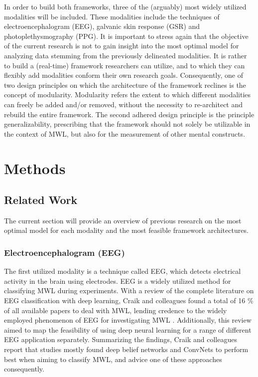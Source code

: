 \documentclass{article}
\begin{document}
In order to build both frameworks, three of the (arguably) most widely utilized modalities will be included. These modalities include the techniques of electroencephalogram (EEG), galvanic skin response (GSR) and photoplethysmography (PPG). It is important to stress again that the objective of the current research is not to gain insight into the most optimal model for analyzing data stemming from the previously delineated modalities. It is rather to build a (real-time) framework researchers can utilize, and to which they can flexibly add modalities conform their own research goals. Consequently, one of two design principles on which the architecture of the framework reclines is the concept of modularity. Modularity refers the extent to which different modalities can freely be added and/or removed, without the necessity to re-architect and rebuild the entire framework. The second adhered design principle is the principle generalizability, prescribing that the framework should not solely be utilizable in the context of MWL, but also for the measurement of other mental constructs.

\newpage
\section{Methods}

\subsection{Related Work}
The current section will provide an overview of previous research on the most optimal model for each modality and the most feasible framework architectures.

\subsubsection{Electroencephalogram (EEG)}
The first utilized modality is a technique  called EEG, which detects electrical activity in the brain using electrodes. EEG is a widely utilized method for classifying MWL during experiments. With a review of the complete literature on EEG classification with deep learning, Craik and colleagues found a total of 16 \% of all available papers to deal with MWL, lending credence to the widely employed phenomenon of EEG for investigating MWL \cite{craik2019deep}. Additionally, this review aimed to map the feasibility of using deep neural learning for a range of different EEG application separately. Summarizing the findings, Craik and colleagues report that studies mostly found deep belief networks and ConvNets to perform best when aiming to classify MWL, and advice one of these approaches consequently.\cite{craik2019deep} 
\end{document}
